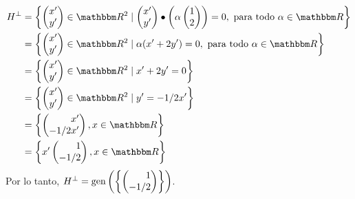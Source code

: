 \begin{example}
{
    }
    \begin{align*}
        H^{\bot} & = \left\{ \begin{pmatrix} x' \\ y' \end{pmatrix} \in \RR[2] \mid \begin{pmatrix} x' \\ y' \end{pmatrix} \bullet \left( \alpha \begin{pmatrix} 1 \\ 2 \end{pmatrix} \right) = 0, \text{ para todo } \alpha \in \RR \right\} \\
        & = \left\{ \begin{pmatrix} x' \\ y' \end{pmatrix} \in \RR[2] \mid \alpha (x' + 2y') = 0, \text{ para todo } \alpha \in \RR \right\} \\
        & = \left\{ \begin{pmatrix} x' \\ y' \end{pmatrix} \in \RR[2] \mid x' + 2y' = 0 \right\} \\
        & = \left\{ \begin{pmatrix} x' \\ y' \end{pmatrix} \in \RR[2] \mid y' = -1/2 x' \right\} \\
        & = \left\{ \begin{pmatrix*}[r] x' \\ -1/2 x' \end{pmatrix*}, x \in \RR \right\} \\
        & = \left\{ x' \begin{pmatrix*}[r] 1 \\ -1/2 \end{pmatrix*}, x \in \RR \right\}
    \end{align*}
    Por lo tanto, $H^{\bot} = \Gen \left( \left\{ \begin{pmatrix*}[r] 1 \\ -1/2 \end{pmatrix*} \right\} \right)$.
\end{example}

